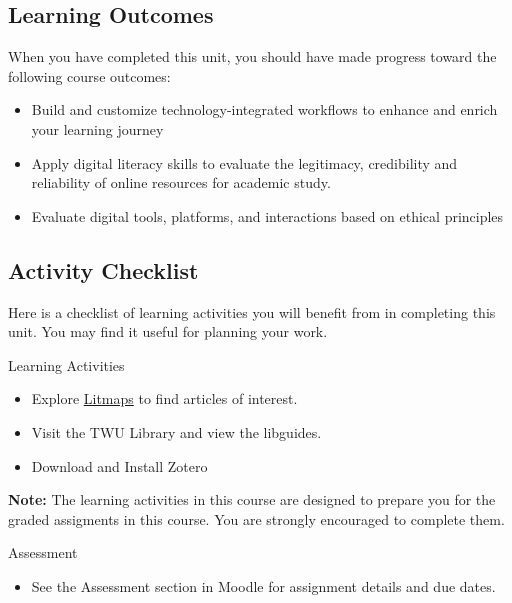 \documentclass[
]{book}
\providecommand{\tightlist}{%
  \setlength{\itemsep}{0pt}\setlength{\parskip}{0pt}}
\theoremstyle{definition}
\theoremstyle{definition}
\theoremstyle{definition}
\theoremstyle{definition}
\theoremstyle{remark}
\begin{document}
\hypertarget{learning-outcomes-1}{%
\subsection*{Learning Outcomes}\label{learning-outcomes-1}}

When you have completed this unit, you should have made progress toward the following course outcomes:

\begin{itemize}
\tightlist
\item
  Build and customize technology-integrated workflows to enhance and enrich your learning journey
\item
  Apply digital literacy skills to evaluate the legitimacy, credibility and reliability of online resources for academic study.
\item
  Evaluate digital tools, platforms, and interactions based on ethical principles
\end{itemize}

\hypertarget{activity-checklist-1}{%
\subsection*{Activity Checklist}\label{activity-checklist-1}}

Here is a checklist of learning activities you will benefit from in completing this unit. You may find it useful for planning your work.

\begin{reflect}
{Learning Activities}

\begin{itemize}
\tightlist
\item
  Explore \href{https://litmaps.com}{Litmaps} to find articles of interest.
\item
  Visit the TWU Library and view the libguides.
\item
  Download and Install Zotero
\end{itemize}

\textbf{Note:} The learning activities in this course are designed to prepare you for the graded assigments in this course. You are strongly encouraged to complete them.
\end{reflect}

\begin{assessment}
{Assessment}

\begin{itemize}
\tightlist
\item
  See the Assessment section in Moodle for assignment details and due dates.
\end{itemize}
\end{assessment}
\end{document}
